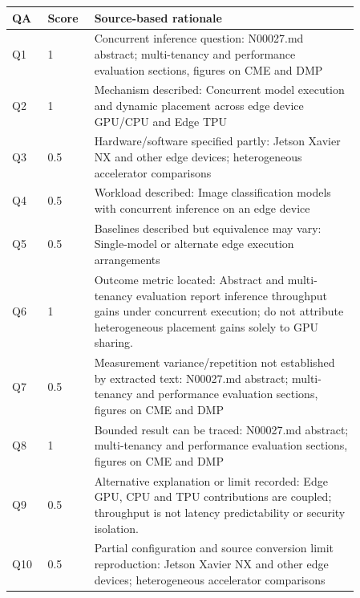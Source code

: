 \begin{longtable}{P{0.09\linewidth}P{0.10\linewidth}P{0.67\linewidth}}
\toprule QA & Score & Source-based rationale\\\midrule\endhead
Q1 & 1 & Concurrent inference question: N00027.md abstract; multi-tenancy and performance evaluation sections, figures on CME and DMP\\
Q2 & 1 & Mechanism described: Concurrent model execution and dynamic placement across edge device GPU/CPU and Edge TPU\\
Q3 & 0.5 & Hardware/software specified partly: Jetson Xavier NX and other edge devices; heterogeneous accelerator comparisons\\
Q4 & 0.5 & Workload described: Image classification models with concurrent inference on an edge device\\
Q5 & 0.5 & Baselines described but equivalence may vary: Single-model or alternate edge execution arrangements\\
Q6 & 1 & Outcome metric located: Abstract and multi-tenancy evaluation report inference throughput gains under concurrent execution; do not attribute heterogeneous placement gains solely to GPU sharing.\\
Q7 & 0.5 & Measurement variance/repetition not established by extracted text: N00027.md abstract; multi-tenancy and performance evaluation sections, figures on CME and DMP\\
Q8 & 1 & Bounded result can be traced: N00027.md abstract; multi-tenancy and performance evaluation sections, figures on CME and DMP\\
Q9 & 0.5 & Alternative explanation or limit recorded: Edge GPU, CPU and TPU contributions are coupled; throughput is not latency predictability or security isolation.\\
Q10 & 0.5 & Partial configuration and source conversion limit reproduction: Jetson Xavier NX and other edge devices; heterogeneous accelerator comparisons\\
\bottomrule\end{longtable}


